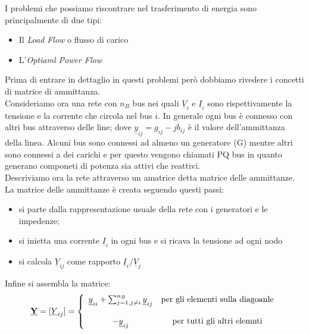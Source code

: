 I problemi che possiamo riscontrare nel trasferimento di energia sono principalmente di due tipi:
\begin{itemize}
\item Il \emph{Load Flow} o flusso di carico 
\item L'\emph{Optiaml Power Flow}
\end{itemize}
Prima di entrare in dettaglio in questi problemi però dobbiamo rivedere i concetti di matrice di ammittanza.\\
Consideriamo ora una rete con $n_B$ bus nei quali $\underline{V}_i$ e $\underline{I}_i$ sono rispettivamente la tensione e la corrente che circola nel bus $i$. In generale ogni bus è connesso con altri bus attraverso delle line; dove $\underline{y}_{ij} = g_{ij}-jb_{ij}$ è il valore dell'ammittanza della linea. Alcuni bus sono connessi ad almeno un generatore (G) mentre altri sono connessi a dei carichi e per questo vengono chiamati PQ bus in quanto generano componeti di potenza sia attivi che reattivi.\\
Descriviamo ora la rete attraverso un amatrice detta matrice delle ammittanze.
La matrice delle ammittanze è creata seguendo questi passi:
\begin{itemize}
\item si parte dalla rappresentazione usuale della rete con i generatori e le impedenze;
\item si inietta una corrente $\underline{I}_i$ in ogni bus e si ricava la tensione ad ogni nodo 
\item si calcola $\underline{Y}_{ij}$ come rapporto $\underline{I}_i/\underline{V}_j$
\end{itemize}
Infine si assembla la matrice:
$$
\textbf{\underline{Y}}=[\underline{Y}_{ij}]=\left\{
\begin{array}{cc}
\underline{y}_{ii}+\sum_{j=1,j\neq i}^{n_B}\underline{y}_{ij}& \mbox{per gli elementi sulla diagoanle}\\
\\
-\underline{y}_{ij}& \mbox{per tutti gli altri elemnti}
\end{array}
\right.
$$
